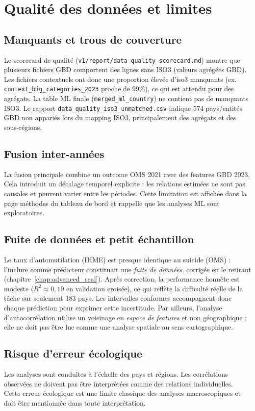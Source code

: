 \chapter{Qualité des données et limites}
\section{Manquants et trous de couverture}
Le scorecard de qualité (\texttt{v1/report/data\_quality\_scorecard.md}) montre que plusieurs fichiers GBD comportent des lignes sans ISO3 (valeurs agrégées GBD). Les fichiers contextuels ont donc une proportion élevée d'iso3 manquants (ex. \texttt{context\_big\_categories\_2023} proche de 99\%), ce qui est attendu pour des agrégats. La table ML finale (\texttt{merged\_ml\_country}) ne contient pas de manquants ISO3. Le rapport \texttt{data\_quality\_iso3\_unmatched.csv} indique 574 pays/entités GBD non appariés lors du mapping ISO3, principalement des agrégats et des sous-régions.

\section{Fusion inter-années}
La fusion principale combine un outcome OMS 2021 avec des features GBD 2023. Cela introduit un décalage temporel explicite : les relations estimées ne sont pas causales et peuvent varier entre les périodes. Cette limitation est affichée dans la page méthodes du tableau de bord et rappelle que les analyses ML sont exploratoires.

\section{Fuite de données et petit échantillon}
Le taux d'automutilation (IHME) est presque identique au suicide (OMS) : l'inclure comme prédicteur constituait une \emph{fuite de données}, corrigée en le retirant (chapitre~\ref{chap:advanced_real}). Après correction, la performance honnête est modeste ($R^2 \approx 0{,}19$ en validation croisée), ce qui reflète la difficulté réelle de la tâche sur seulement 183 pays. Les intervalles conformes accompagnent donc chaque prédiction pour exprimer cette incertitude. Par ailleurs, l'analyse d'autocorrélation utilise un voisinage en \emph{espace de features} et non géographique ; elle ne doit pas être lue comme une analyse spatiale au sens cartographique.

\section{Risque d'erreur écologique}
Les analyses sont conduites à l'échelle des pays et régions. Les corrélations observées ne doivent pas être interprétées comme des relations individuelles. Cette erreur écologique est une limite classique des analyses macroscopiques et doit être mentionnée dans toute interprétation.

